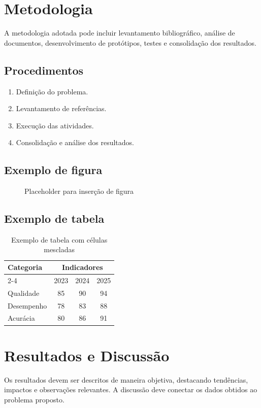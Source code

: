 \documentclass[12pt,a4paper]{report}
\begin{document}
\chapter{Metodologia}
A metodologia adotada pode incluir levantamento bibliográfico, análise de documentos, desenvolvimento de protótipos, testes e consolidação dos resultados.

\section{Procedimentos}
\begin{enumerate}
    \item Definição do problema.
    \item Levantamento de referências.
    \item Execução das atividades.
    \item Consolidação e análise dos resultados.
\end{enumerate}

\section{Exemplo de figura}
\begin{figure}[h]
    \centering
    \fbox{\rule{0pt}{4cm}\rule{0.8\textwidth}{0pt}}
    \caption{Placeholder para inserção de figura}
    \label{fig:placeholder}
\end{figure}

\section{Exemplo de tabela}
\begin{table}[h]
\centering
\caption{Exemplo de tabela com células mescladas}
\label{tab:exemplo}
\begin{tabular}{lccc}
\toprule
\multirow{2}{*}{Categoria} & \multicolumn{3}{c}{Indicadores} \\
\cmidrule(lr){2-4}
 & 2023 & 2024 & 2025 \\
\midrule
Qualidade & 85 & 90 & 94 \\
Desempenho & 78 & 83 & 88 \\
Acurácia & 80 & 86 & 91 \\
\bottomrule
\end{tabular}
\end{table}

\chapter{Resultados e Discussão}
Os resultados devem ser descritos de maneira objetiva, destacando tendências, impactos e observações relevantes. A discussão deve conectar os dados obtidos ao problema proposto.
\end{document}
